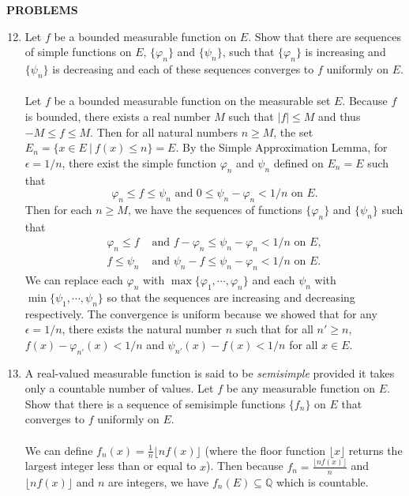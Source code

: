 \begin{center}
	\textbf{PROBLEMS}
\end{center}
\begin{enumerate}
	\setcounter{enumi}{11}
    \item Let $f$ be a bounded measurable function on $E$. Show that there are sequences of simple functions on $E$, $\{\varphi_n\}$ and $\{\psi_n\}$, such that $\{\varphi_n\}$ is increasing and $\{\psi_n\}$ is decreasing and each of these sequences converges to $f$ uniformly on $E$.\\
    \\Let $f$ be a bounded measurable function on the measurable set $E$.
    Because $f$ is bounded, there exists a real number $M$ such that $|f|\le M$ and thus $-M\le f\le M$.
    Then for all natural numbers $n\ge M$, the set $E_n=\{x\in E\ |\ f(x)\le n\}=E$.
    By the Simple Approximation Lemma, for $\epsilon=1/n$, there exist the simple function $\varphi_n$ and $\psi_n$ defined on $E_n=E$ such that 
    \[
            \varphi_n\le f\le\psi_n\text{ and }0\le\psi_n-\varphi_n<1/n\text{ on }E.    
    \]
    Then for each $n\ge M$, we have the sequences of functions $\{\varphi_n\}$ and $\{\psi_n\}$ such that
    \begin{align*}
        \varphi_n\le f&\text{ and }f-\varphi_n\le\psi_n-\varphi_n<1/n\text{ on }E,\\  
        f\le\psi_n&\text{ and }\psi_n-f\le\psi_n-\varphi_n<1/n\text{ on }E.    
    \end{align*}
    We can replace each $\varphi_n$ with $\max\{\varphi_1,\cdots,\varphi_n\}$ and each $\psi_n$ with $\min\{\psi_1,\cdots,\psi_n\}$ so that the sequences are increasing and decreasing respectively.
    The convergence is uniform because we showed that for any $\epsilon=1/n$, there exists the natural number $n$ such that for all $n'\ge n$, $f(x)-\varphi_{n'}(x)<1/n$ and $\psi_{n'}(x)-f(x)<1/n$ for all $x\in E$.
    \item A real-valued measurable function is said to be \textit{semisimple} provided it takes only a countable number of values. Let $f$ be any measurable function on $E$.
    Show that there is a sequence of semisimple functions $\{f_n\}$ on $E$ that converges to $f$ uniformly on $E$.\\
    \\We can define $f_n(x)=\frac{1}{n}\lfloor nf(x)\rfloor$ (where the floor function $\lfloor x\rfloor$ returns the largest integer less than or equal to $x$).
    Then because $f_n=\frac{\lfloor nf(x)\rfloor}{n}$ and $\lfloor nf(x)\rfloor$ and $n$ are integers, we have $f_n(E)\subseteq\mathbb{Q}$ which is countable.

\end{enumerate}
